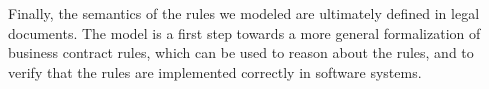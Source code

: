 Finally, the semantics of the rules we modeled are ultimately defined in legal documents. The model is a first step towards a more general formalization of business contract rules, which can be used to reason about the rules, and to verify that the rules are implemented correctly in software systems.